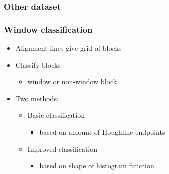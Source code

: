 \documentclass{beamer}
\begin{document}
\frame
{
}


\frame
{
}

\frame
{
	\frametitle{Other dataset}
}

\frame
{
}

\frame
{
}


\frame
{
}


\frame
{
	\frametitle{Window classification}
	\begin{itemize}
	\item <+-| alert@+> Alignment lines give grid of blocks
	\item <+-| alert@+> Classify blocks 
		\begin{itemize}
		\item <+-| alert@+> window or non-window block
		\end{itemize}
	\item <+-| alert@+> Two methods:
		\begin{itemize}
		\item <+-| alert@+> Basic classification 
			\begin{itemize}
			\item <+-| alert@+> based on amount of Houghline endpoints
			\end{itemize}
		\item <+-| alert@+> Improved classification 
			\begin{itemize}
			\item <+-| alert@+> based on shape of histogram function
			\end{itemize}
		\end{itemize}
	\end{itemize}
}
\end{document}
